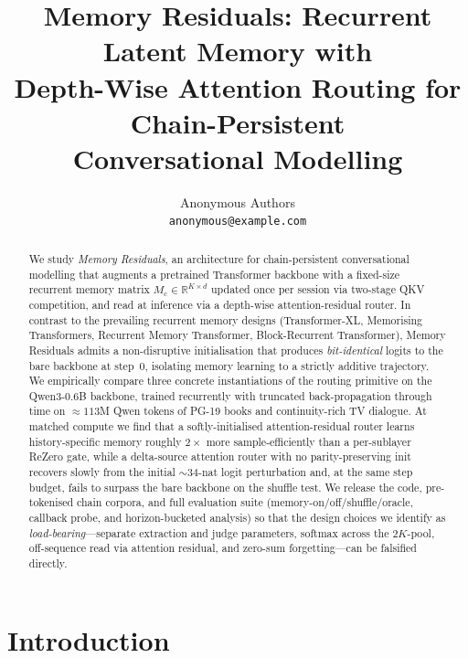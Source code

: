 \documentclass{article}
\title{Memory Residuals: Recurrent Latent Memory with\\ Depth-Wise Attention Routing for Chain-Persistent\\ Conversational Modelling}
\author{%
  Anonymous Authors\\
  \texttt{anonymous@example.com}%
}
\newcommand{\Mc}{M_{\text{c}}}
\begin{document}
\maketitle

\begin{abstract}
We study \emph{Memory Residuals}, an architecture for chain-persistent
conversational modelling that augments a pretrained Transformer
backbone with a fixed-size recurrent memory matrix
$\Mc \in \mathbb{R}^{K\times d}$ updated once per session via
two-stage QKV competition, and read at inference via a depth-wise
attention-residual router. In contrast to the prevailing recurrent
memory designs (Transformer-XL, Memorising Transformers, Recurrent
Memory Transformer, Block-Recurrent Transformer), Memory Residuals
admits a non-disruptive initialisation that produces \emph{bit-identical}
logits to the bare backbone at step~0, isolating memory learning to a
strictly additive trajectory.
We empirically compare three concrete instantiations of the routing
primitive on the Qwen3-0.6B backbone, trained recurrently with
truncated back-propagation through time on $\approx 113$M Qwen tokens
of PG-19 books and continuity-rich TV dialogue.
At matched compute we find that a softly-initialised attention-residual
router learns history-specific memory roughly $2\times$ more
sample-efficiently than a per-sublayer ReZero gate, while a delta-source
attention router with no parity-preserving init recovers slowly from
the initial $\sim 34$-nat logit perturbation and, at the same step
budget, fails to surpass the bare backbone on the shuffle test.
We release the code, pre-tokenised chain corpora, and full evaluation
suite (memory-on/off/shuffle/oracle, callback probe, and
horizon-bucketed analysis) so that the design choices we identify
as \emph{load-bearing}---separate extraction and judge parameters,
softmax across the $2K$-pool, off-sequence read via attention residual,
and zero-sum forgetting---can be falsified directly.
\end{abstract}


\section{Introduction}
\end{document}
